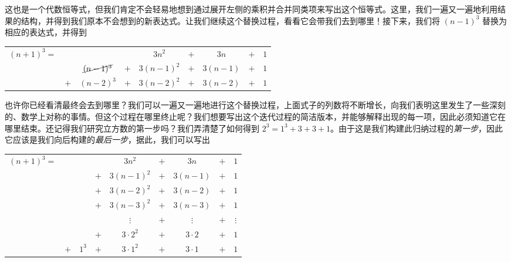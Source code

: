 这也是一个代数恒等式，但我们肯定不会轻易地想到通过展开左侧的乘积并合并同类项来写出这个恒等式。这里，我们一遍又一遍地利用结果的结构，并得到我们原本不会想到的新表达式。让我们继续这个替换过程，看看它会带我们去到哪里！接下来，我们将 $(n - 1)^3$ 替换为相应的表达式，并得到

\begin{center}
    \begin{tabular}{rcccccccc}
        $(n+1)^3=$ &     &                    &     &   $3n^2$   & $+$ &   $3n$   & $+$ & $1$\\
                   &     & $\cancel{(n-1)^3}$ & $+$ & $3(n-1)^2$ & $+$ & $3(n-1)$ & $+$ & $1$\\
                   & $+$ & $(n-2)^3$          & $+$ & $3(n-2)^2$ & $+$ & $3(n-2)$ & $+$ & $1$\\
    \end{tabular}
\end{center}

也许你已经看清最终会去到哪里？我们可以一遍又一遍地进行这个替换过程，上面式子的列数将不断增长，向我们表明这里发生了一些深刻的、数学上对称的事情。但这个过程在哪里终止呢？我们想要写出这个迭代过程的简洁版本，并能够解释出现的每一项，因此必须知道它在哪里结束。还记得我们研究立方数的第一步吗？我们弄清楚了如何得到 $2^3 = 1^3 + 3 + 3 + 1$。由于这是我们构建此归纳过程的\textit{第一步}，因此它应该是我们向后构建的\textit{最后一步}，据此，我们可以写出

\begin{center}
    \begin{tabular}{rcccccccc}
        $(n+1)^3=$ &     &       &     &   $3n^2$   & $+$ &   $3n$   & $+$ & $1$\\
                   &     &       & $+$ & $3(n-1)^2$ & $+$ & $3(n-1)$ & $+$ & $1$\\
                   &     &       & $+$ & $3(n-2)^2$ & $+$ & $3(n-2)$ & $+$ & $1$\\
                   &     &       & $+$ & $3(n-3)^2$ & $+$ & $3(n-3)$ & $+$ & $1$\\
                   &     &       &     & $\vdots$   & $+$ & $\vdots$ & $+$ & $\vdots$\\
                   &     &       & $+$ & $3 \cdot 2^2$ & $+$ & $3 \cdot 2$ & $+$ & $1$\\
                   & $+$ & $1^3$ & $+$ & $3 \cdot 1^2$ & $+$ & $3 \cdot 1$ & $+$ & $1$\\
    \end{tabular}
\end{center}

